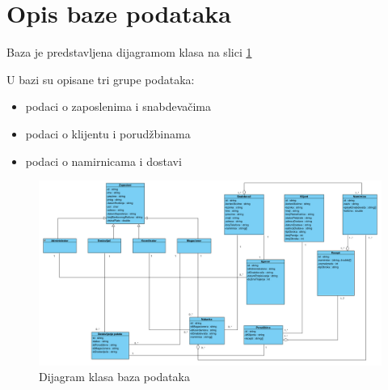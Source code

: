 \section{\bfseries Opis baze podataka}
Baza je predstavljena dijagramom klasa na slici \ref{fig:ClassDiagramDatabase}

U bazi su opisane tri grupe podataka:
\begin{itemize}
    \item podaci o zaposlenima i snabdevačima
    \item podaci o klijentu i porudžbinama
    \item podaci o namirnicama i dostavi
\end{itemize}





\begin{figure}[H]
	\begin{center}
		\includegraphics[width=\textwidth]{Pictures/class_diagram_database.png}

    		\caption{Dijagram klasa baza podataka}
    \label{fig:ClassDiagramDatabase}
    \end{center}
 
\end{figure}
